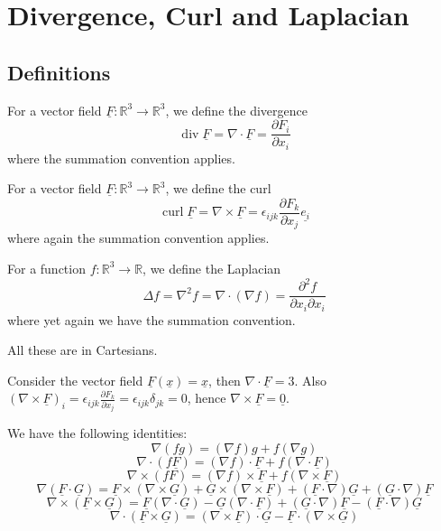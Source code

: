 \section{Divergence, Curl and Laplacian}
\subsection{Definitions}
\begin{definition}
    For a vector field $\underline{F}:\mathbb R^3\to\mathbb R^3$, we define the divergence
    $$\operatorname{div}\underline{F}=\nabla\cdot\underline{F}=\frac{\partial F_i}{\partial x_i}$$
    where the summation convention applies.
\end{definition}
\begin{definition}
    For a vector field $\underline{F}:\mathbb R^3\to\mathbb R^3$, we define the curl
    $$\operatorname{curl}\underline{F}=\nabla\times\underline{F}=\epsilon_{ijk}\frac{\partial F_k}{\partial x_j}\underline{e_i}$$
    where again the summation convention applies.
\end{definition}
\begin{definition}
    For a function $f:\mathbb R^3\to\mathbb R$, we define the Laplacian
    $$\Delta f=\nabla^2f=\nabla\cdot(\nabla f)=\frac{\partial^2 f}{\partial x_i\partial x_i}$$
    where yet again we have the summation convention.
\end{definition}
\begin{note}
    All these are in Cartesians.
\end{note}
\begin{example}
    Consider the vector field $\underline{F}(\underline{x})=\underline{x}$, then $\nabla\cdot\underline{F}=3$.
    Also $(\nabla\times\underline{F})_i=\epsilon_{ijk}\frac{\partial F_k}{\partial x_j}=\epsilon_{ijk}\delta_{jk}=0$, hence $\nabla\times\underline{F}=\underline{0}$.
\end{example}
\begin{proposition}
    We have the following identities:
    $$\nabla(fg)=(\nabla f)g+f(\nabla g)$$
    $$\nabla\cdot(f\underline{F})=(\nabla f)\cdot\underline{F}+f(\nabla\cdot\underline{F})$$
    $$\nabla\times (fF)=(\nabla f)\times\underline{F}+f(\nabla\times\underline{F})$$
    $$\nabla(\underline{F}\cdot\underline{G})=\underline{F}\times(\nabla\times\underline{G})+\underline{G}\times(\nabla\times\underline{F})+(\underline{F}\cdot\nabla)\underline{G}+(\underline{G}\cdot\nabla)\underline{F}$$
    $$\nabla\times(\underline{F}\times\underline{G})=\underline{F}(\nabla\cdot\underline{G})-\underline{G}(\nabla\cdot\underline{F})+(\underline{G}\cdot\nabla)\underline{F}-(\underline{F}\cdot\nabla)\underline{G}$$
    $$\nabla\cdot(\underline{F}\times\underline{G})=(\nabla\times\underline{F})\cdot\underline{G}-\underline{F}\cdot(\nabla\times\underline{G})$$
\end{proposition}
